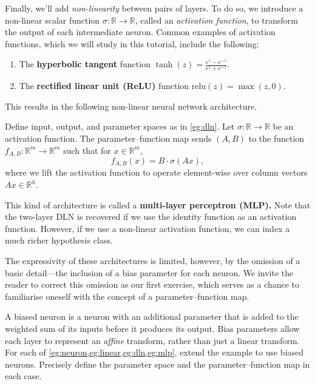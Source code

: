 \documentclass[11pt]{article}
\newcommand{\R}{\mathbb{R}}
\newcommand{\relu}{\mathrm{relu}}
\begin{document}
Finally, we'll add \emph{non-linearity} between pairs of layers. To do so, we
introduce a non-linear scalar function $\sigma : \R \to \R$, called an
\emph{activation function}, to transform the output of each intermediate
neuron. Common examples of activation functions, which we will study in this
tutorial, include the following:
\begin{enumerate}
    \item
        The \textbf{hyperbolic tangent} function
            $\displaystyle \tanh(z) = \frac{e^z-e^{-z}}{e^z + e^{-z}}$.
    \item
        The \textbf{rectified linear unit (ReLU)} function $\relu(z) = \max(z, 0)$.
\end{enumerate}
This results in the following non-linear neural network architecture.

\begin{example}\label{eg:mlp}
    Define input, output, and parameter spaces as in \cref{eg:dln}.
    Let $\sigma : \R \to \R$ be an activation function.
    The parameter--function map sends $(A, B)$ to the function
        $f_{A,B} : \R^m \to \R^m$ such that for $x \in \R^m$,
    \begin{equation}
        f_{A,B}(x)
        = B \cdot \sigma( A x ),
    \end{equation}
    where we lift the activation function to operate element-wise over column
    vectors $A x \in \R^h$.
\end{example}
This kind of architecture is called a \textbf{multi-layer perceptron (MLP).}
Note that the two-layer DLN is recovered if we use the identity function as an
activation function. However, if we use a non-linear activation function, we
can index a much richer hypothesis class.

The expressivity of these architectures is limited, however, by the omission of
a basic detail---the inclusion of a bias parameter for each neuron. We invite
the reader to correct this omission as our first exercise, which serves as a
chance to familiarise oneself with the concept of a parameter--function map.

\begin{exercise}
\label{ex:biased-neurons}
    A biased neuron is a neuron with an additional parameter that is added to
    the weighted sum of its inputs before it produces its output. Bias
    parameters allow each layer to represent an \emph{affine} transform, rather
    than just a linear transform. For each of
    \cref{eg:neuron,eg:linear,eg:dln,eg:mlp}, extend the example to use
    biased neurons. Precisely define the parameter space and the
    parameter--function map in each case.
\end{exercise}
\end{document}
